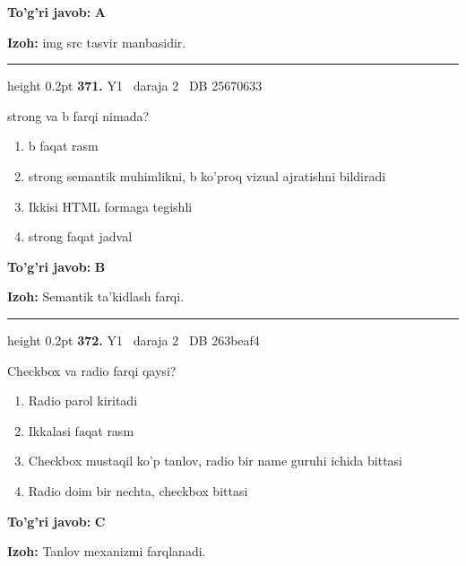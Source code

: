 \documentclass[10pt,a4paper,oneside]{article}
\begin{document}
\begin{tcolorbox}[enhanced,breakable,colback=teal!4,colframe=teal!45!black,boxrule=0.45pt,arc=1.2mm,left=2.8mm,right=2.8mm,top=2mm,bottom=2mm,before skip=2mm,after skip=2mm]
\textbf{\color{teal}To'g'ri javob:} \textbf{A}
\par\smallskip
\textbf{Izoh:} img src tasvir manbasidir.
\end{tcolorbox}
\vspace{2mm}\hrule height 0.2pt \vspace{4mm}
\hypertarget{q371}{\textbf{\color{ink}371.}}  {\color{muted}\scriptsize Y1 \textbullet\ daraja 2 \textbullet\ DB 25670633}
\par
strong va b farqi nimada?
\begin{enumerate}[label=\Alph*),leftmargin=9mm]
\item b faqat rasm
\item strong semantik muhimlikni, b ko'proq vizual ajratishni bildiradi
\item Ikkisi HTML formaga tegishli
\item strong faqat jadval
\end{enumerate}
\begin{tcolorbox}[enhanced,breakable,colback=teal!4,colframe=teal!45!black,boxrule=0.45pt,arc=1.2mm,left=2.8mm,right=2.8mm,top=2mm,bottom=2mm,before skip=2mm,after skip=2mm]
\textbf{\color{teal}To'g'ri javob:} \textbf{B}
\par\smallskip
\textbf{Izoh:} Semantik ta'kidlash farqi.
\end{tcolorbox}
\vspace{2mm}\hrule height 0.2pt \vspace{4mm}
\hypertarget{q372}{\textbf{\color{ink}372.}}  {\color{muted}\scriptsize Y1 \textbullet\ daraja 2 \textbullet\ DB 263beaf4}
\par
Checkbox va radio farqi qaysi?
\begin{enumerate}[label=\Alph*),leftmargin=9mm]
\item Radio parol kiritadi
\item Ikkalasi faqat rasm
\item Checkbox mustaqil ko'p tanlov, radio bir name guruhi ichida bittasi
\item Radio doim bir nechta, checkbox bittasi
\end{enumerate}
\begin{tcolorbox}[enhanced,breakable,colback=teal!4,colframe=teal!45!black,boxrule=0.45pt,arc=1.2mm,left=2.8mm,right=2.8mm,top=2mm,bottom=2mm,before skip=2mm,after skip=2mm]
\textbf{\color{teal}To'g'ri javob:} \textbf{C}
\par\smallskip
\textbf{Izoh:} Tanlov mexanizmi farqlanadi.
\end{tcolorbox}
\end{document}

